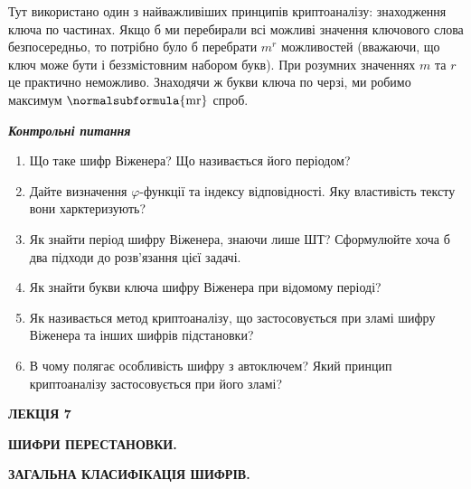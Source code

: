 Тут використано один з найважливіших принципів криптоаналізу: знаходження ключа
по частинах. Якщо б ми перебирали всі можливі значення ключового слова
безпосередньо, то потрібно було б перебрати  ${m^{{r}}}$ можливостей (вважаючи,
що ключ може бути і беззмістовним набором букв). При розумних значеннях  ${m}$
та  ${r}$ це практично неможливо. Знаходячи ж букви ключа по черзі, ми робимо
максимум  ${\normalsubformula{\text{mr}}}$ спроб.


\bigskip


\bigskip

{\centering\bfseries\itshape
Контрольні питання
\par}


\bigskip


\bigskip

\liststyleWWviiiNumxiii
\begin{enumerate}
\item Що таке шифр Віженера? Що називається його періодом?
\item Дайте визначення  ${\varphi }${}-функції та індексу відповідності. Яку
властивість тексту вони харктеризують?
\item Як знайти період шифру Віженера, знаючи лише ШТ? Сформулюйте хоча б два
підходи до розв’язання цієї задачі.
\item Як знайти букви ключа шифру Віженера при відомому періоді?
\item Як називається метод криптоаналізу, що застосовується при зламі шифру
Віженера та інших шифрів підстановки?
\item В чому полягає особливість шифру з автоключем? Який принцип криптоаналізу
застосовується при його зламі?
\end{enumerate}

\bigskip


\bigskip


\bigskip


\bigskip


\bigskip


\bigskip


\bigskip


\bigskip


\bigskip


\bigskip

{\bfseries
ЛЕКЦІЯ 7}


\bigskip

{\centering\bfseries
ШИФРИ  ПЕРЕСТАНОВКИ.
\par}

{\centering\bfseries
ЗАГАЛЬНА  КЛАСИФІКАЦІЯ  ШИФРІВ.
\par}

